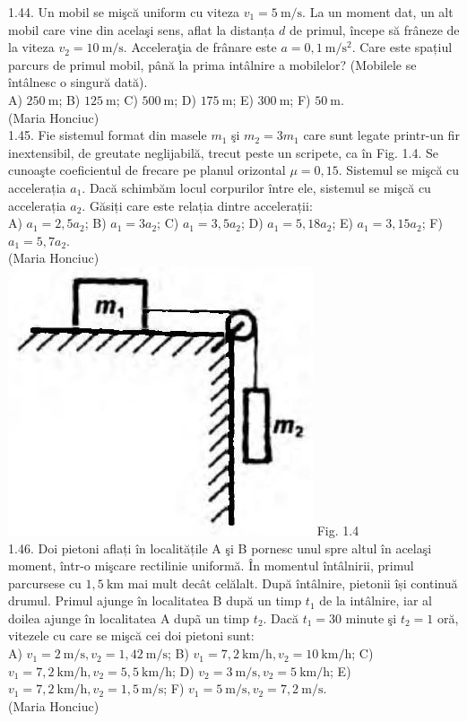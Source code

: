 1.44. Un mobil se mişcă uniform cu viteza $v_{1}=5 \mathrm{~m} / \mathrm{s}$. La un moment dat, un alt mobil care vine din acelaşi sens, aflat la distanța $d$ de primul, începe să frâneze de la viteza $v_{2}=10 \mathrm{~m} / \mathrm{s}$. Acceleraţia de frânare este $a=0,1 \mathrm{~m} / \mathrm{s}^{2}$. Care este spațiul parcurs de primul mobil, până la prima intâlnire a mobilelor? (Mobilele se întâlnesc o singură dată).\\ A) $250 \mathrm{~m}$; B) $125 \mathrm{~m}$; C) $500 \mathrm{~m}$; D) $175 \mathrm{~m}$; E) $300 \mathrm{~m}$; F) $50 \mathrm{~m}$.\\ (Maria Honciuc)\\

1.45. Fie sistemul format din masele $m_{1}$ şi $m_{2}=3 m_{1}$ care sunt legate printr-un fir inextensibil, de greutate neglijabilă, trecut peste un scripete, ca în Fig. 1.4. Se cunoaşte coeficientul de frecare pe planul orizontal $\mu=0,15$. Sistemul se mişcă cu accelerația $a_{1}$. Dacă schimbăm locul corpurilor între ele, sistemul se mişcă cu accelerația $a_{2}$. Găsiți care este relația dintre accelerații:\\ A) $a_{1}=2,5 a_{2}$; B) $a_{1}=3 a_{2}$; C) $a_{1}=3,5 a_{2}$; D) $a_{1}=5,18 a_{2}$; E) $a_{1}=3,15 a_{2}$; F) $a_{1}=5,7 a_{2}$.\\ (Maria Honciuc)\\ \includegraphics[width=0.4\linewidth]{images/2025_07_01_5b3ff9fa0d508c8e9f17g-012} Fig. 1.4\\

1.46. Doi pietoni aflați în localitățile A şi B pornesc unul spre altul în acelaşi moment, într-o mişcare rectilinie uniformă. În momentul întâlnirii, primul parcursese cu $1,5 \mathrm{~km}$ mai mult decât celălalt. După întâlnire, pietonii își continuă drumul. Primul ajunge în localitatea B după un timp $t_{1}$ de la intâlnire, iar al doilea ajunge în localitatea A dupã un timp $t_{2}$. Dacă $t_{1}=30$ minute şi $t_{2}=1$ oră, vitezele cu care se mişcă cei doi pietoni sunt:\\ A) $v_{1}=2 \mathrm{~m} / \mathrm{s}, v_{2}=1,42 \mathrm{~m} / \mathrm{s}$; B) $v_{1}=7,2 \mathrm{~km} / \mathrm{h}, v_{2}=10 \mathrm{~km} / \mathrm{h}$; C) $v_{1}=7,2 \mathrm{~km} / \mathrm{h}, v_{2}=5,5 \mathrm{~km} / \mathrm{h}$; D) $v_{2}=3 \mathrm{~m} / \mathrm{s}, v_{2}=5 \mathrm{~km} / \mathrm{h}$; E) $v_{1}=7,2 \mathrm{~km} / \mathrm{h}, v_{2}=1,5 \mathrm{~m} / \mathrm{s}$; F) $v_{1}=5 \mathrm{~m} / \mathrm{s}, v_{2}=7,2 \mathrm{~m} / \mathrm{s}$.\\ (Maria Honciuc)\\

